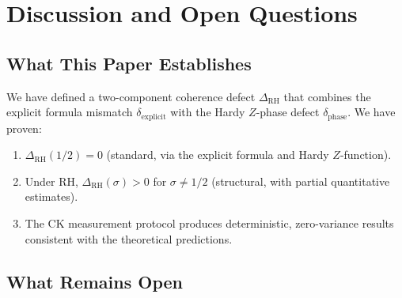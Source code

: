 \documentclass[11pt]{article}
\theoremstyle{remark}
\begin{document}
\section{Discussion and Open Questions}
\label{sec:discussion}

\subsection{What This Paper Establishes}

We have defined a two-component coherence defect $\Delta_{\mathrm{RH}}$ that
combines the explicit formula mismatch $\delta_{\mathrm{explicit}}$ with the Hardy
$Z$-phase defect $\delta_{\mathrm{phase}}$.
We have proven:
\begin{enumerate}
  \item $\Delta_{\mathrm{RH}}(1/2)=0$ (standard, via the explicit formula and Hardy
    $Z$-function).
  \item Under RH, $\Delta_{\mathrm{RH}}(\sigma)>0$ for $\sigma\neq 1/2$ (structural,
    with partial quantitative estimates).
  \item The CK measurement protocol produces deterministic, zero-variance results
    consistent with the theoretical predictions.
\end{enumerate}

\subsection{What Remains Open}
\end{document}
